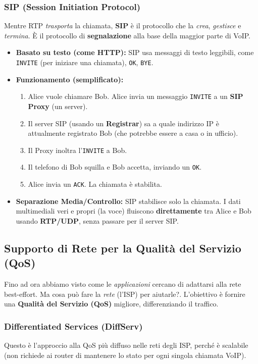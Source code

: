 \subsubsection{SIP (Session Initiation Protocol)}
Mentre RTP \textit{trasporta} la chiamata, \textbf{SIP} è il protocollo che la \textit{crea}, \textit{gestisce} e \textit{termina}. È il protocollo di \textbf{segnalazione} alla base della maggior parte di VoIP.
\begin{itemize}
    \item \textbf{Basato su testo (come HTTP):} SIP usa messaggi di testo leggibili, come \texttt{INVITE} (per iniziare una chiamata), \texttt{OK}, \texttt{BYE}.
    \item \textbf{Funzionamento (semplificato):}
        \begin{enumerate}
            \item Alice vuole chiamare Bob. Alice invia un messaggio \texttt{INVITE} a un \textbf{SIP Proxy} (un server).
            \item Il server SIP (usando un \textbf{Registrar}) sa a quale indirizzo IP è attualmente registrato Bob (che potrebbe essere a casa o in ufficio).
            \item Il Proxy inoltra l'\texttt{INVITE} a Bob.
            \item Il telefono di Bob squilla e Bob accetta, inviando un \texttt{OK}.
            \item Alice invia un \texttt{ACK}. La chiamata è stabilita.
        \end{enumerate}
    \item \textbf{Separazione Media/Controllo:} SIP stabilisce solo la chiamata. I dati multimediali veri e propri (la voce) fluiscono \textbf{direttamente} tra Alice e Bob usando \textbf{RTP/UDP}, senza passare per il server SIP.
\end{itemize}

\subsection{Supporto di Rete per la Qualità del Servizio (QoS)}
Fino ad ora abbiamo visto come le \textit{applicazioni} cercano di adattarsi alla rete best-effort. Ma cosa può fare la \textit{rete} (l'ISP) per aiutarle?.
L'obiettivo è fornire una \textbf{Qualità del Servizio (QoS)} migliore, differenziando il traffico.

\subsubsection{Differentiated Services (DiffServ)}
Questo è l'approccio alla QoS più diffuso nelle reti degli ISP, perché è scalabile (non richiede ai router di mantenere lo stato per ogni singola chiamata VoIP).

